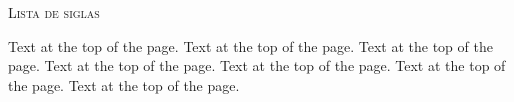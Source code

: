 \clearpage
\begin{center}
\textsc{\LARGE Lista de siglas}\\[1.5cm]
\end{center}

Text at the top of the page. Text at the top of the page. 
Text at the top of the page. Text at the top of the page. 
Text at the top of the page. Text at the top of the page. 
Text at the top of the page.
